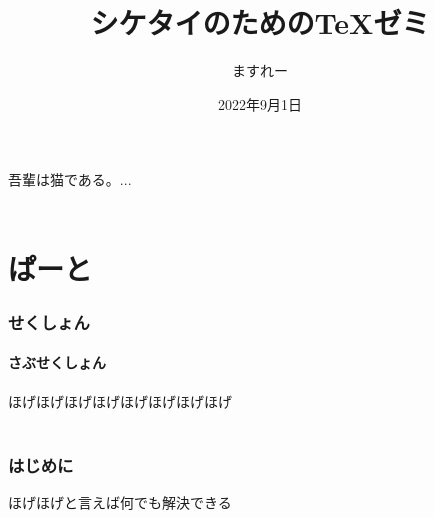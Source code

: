 \documentclass{ltjsarticle}
\title{シケタイのためのTeXゼミ}
\author{ますれー}
\date{2022年9月1日}
\begin{document}
\maketitle
吾輩は猫である。...
\\ \\
\tableofcontents
\noindent
\part{ぱーと}
\section{せくしょん}
\subsection{さぶせくしょん}
ほげほげほげほげほげほげほげほげ
\\ \\
\noindent
\section*{はじめに}
ほげほげと言えば何でも解決できる
\clearpage
\end{document}
